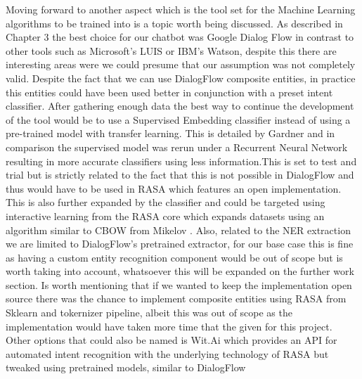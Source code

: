 Moving forward to another aspect which is the tool set for the Machine Learning algorithms to be trained into is a topic worth being discussed. As described in Chapter 3 the best choice for our chatbot was Google Dialog Flow in contrast to other tools such as Microsoft's LUIS or IBM's Watson, despite this there are interesting areas were we could presume that our assumption was not completely valid. Despite the fact that we can use DialogFlow composite entities, in practice this entities could have been used better in conjunction with a preset intent classifier. After gathering enough data the best way to continue the development of the tool would be to use a Supervised Embedding classifier instead of using a pre-trained model with transfer learning. This is detailed by Gardner \cite{spacy} and in comparison the supervised model was rerun under a Recurrent Neural Network resulting in more accurate classifiers using less information.This is set to test and trial but is strictly related to the fact that this is not possible in DialogFlow and thus would have to be used in RASA which features an open implementation. This is also further expanded by the classifier and could be targeted using interactive learning from the RASA core which expands datasets using an algorithm similar to CBOW from Mikelov \cite{word2vec}. Also, related to the NER extraction we are limited to DialogFlow's pretrained extractor, for our base case this is fine as having a custom entity recognition component would be out of scope but is worth taking into account, whatsoever this will be expanded on the further work section. Is worth mentioning that if we wanted to keep the implementation open source there was the chance to implement composite entities using RASA from Sklearn and tokernizer pipeline, albeit this was out of scope as the implementation would have taken more time that the given for this project. Other options that could also be named is Wit.Ai which provides an API for automated intent recognition with the underlying technology of RASA but tweaked using pretrained models, similar to DialogFlow

